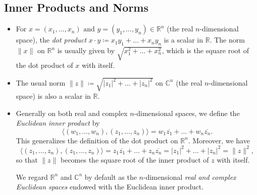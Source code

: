 \documentclass{article}
\newcommand{\R}{\mathbb{R}}
\newcommand{\C}{\mathbb{C}}
\newcommand{\conj}[1]{\overline{#1}}
\newcommand{\inp}[2]{\langle #1, #2 \rangle}
\begin{document}
\subsection{Inner Products and Norms}
\begin{itemize}
    \item For $x=(x_1,\dots,x_n) \text{ and } y=(y_1,\dots,y_n) \in \R^n$ (the real $n$-dimensional space), the \textit{dot product} $x \cdot y \coloneqq x_1y_1+\dots+x_ny_n$ is a scalar in $\R$. The norm $\|x\|$ on $\R^n$ is usually given by $\sqrt{x_1^2+\dots+x_n^2}$, which is the square root of the dot product of $x$ with itself.
    \item The usual norm $\|z\| \coloneqq  \sqrt{|z_1|^2+\dots+|z_n|^2}$ on $\C^n$ (the real $n$-dimensional space) is also a scalar in $\R$.
    \item Generally on both real and complex $n$-dimensional spaces, we define the \textit{Euclidean inner product} by $$\inp{(w_1,\dots,w_n)}{(z_1,\dots,z_n)} =  w_1\conj{z_1}+\dots+w_n\conj{z_n}.$$ This generalizes the definition of the dot product on $\R^n$. Moreover, we have $$\inp{(z_1,\dots,z_n)}{(z_1,\dots,z_n)} = z_1\conj{z_1}+\dots+z_n\conj{z_n} = |z_1|^2 + \dots + |z_n|^2 = \|z\|^2,$$ so that $\|z\|$ becomes the square root of the inner product of $z$ with itself.
    
    We regard $\R^n$ and $\C^n$ by default as the $n$-dimensional \textit{real and complex Euclidean spaces} endowed with the Euclidean inner product. 
    

\end{itemize}
\end{document}
